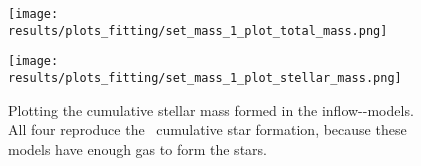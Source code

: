 \begin{figure}[h]
  \begin{minipage}[t][][t]{0.4\textwidth}
  \centering
  \texttt{[image: results/plots\_fitting/set\_mass\_1\_plot\_total\_mass.png]}
  \caption[Total mass of \fiduccialomega for initial/inflow mass-fitting]{\label{fig:fit-v1-1-total}
    The total baryonic mass of the \omegamodel-model for four different initial/inflow parameters.
    $M_0$ is the initial primordial gas of the galaxy(in \msol), $\dot{M}$ is the inflow (in \msol/yr).
    This visualization shows that 44G\msol and 3.7\msol/yr are the optimal parameters to reproduce the two baryonic data-points from \eris, although more then these four were tried.
  }
  \end{minipage}
  \hfill
  \begin{minipage}[t][][t]{0.4\textwidth}
  \centering
  \texttt{[image: results/plots\_fitting/set\_mass\_1\_plot\_stellar\_mass.png]}
  \caption[Stellar mass of \fiduccialomega for initial/inflow mass-fitting]{
    \label{fig:fit-v1-1-stellar}
    Plotting the cumulative stellar mass formed in the inflow-\omegamodel-models. All four reproduce the \eris\ cumulative star formation, because these models have enough gas to form the stars.
  }
  \end{minipage}
\end{figure}

